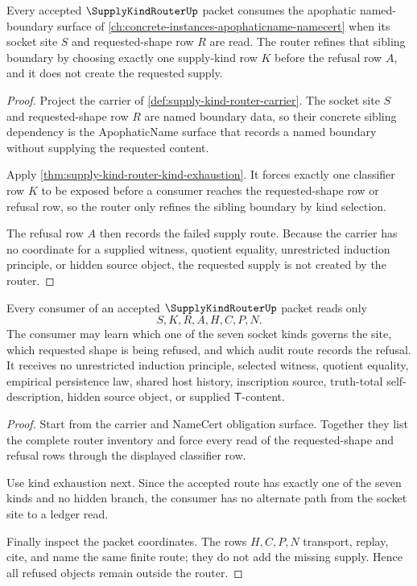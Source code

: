 \begin{theorem}
\label{thm:supply-kind-router-apophatic-socket-dependency}
Every accepted $\SupplyKindRouterUp$ packet consumes the apophatic named-boundary surface of \autoref{ch:concrete-instances-apophaticname-namecert} when its socket site $S$ and requested-shape row $R$ are read. The router refines that sibling boundary by choosing exactly one supply-kind row $K$ before the refusal row $A$, and it does not create the requested supply.
\end{theorem}
\begin{proof}
Project the carrier of \autoref{def:supply-kind-router-carrier}. The socket site $S$ and requested-shape row $R$ are named boundary data, so their concrete sibling dependency is the ApophaticName surface that records a named boundary without supplying the requested content.

Apply \autoref{thm:supply-kind-router-kind-exhaustion}. It forces exactly one classifier row $K$ to be exposed before a consumer reaches the requested-shape row or refusal row, so the router only refines the sibling boundary by kind selection.

The refusal row $A$ then records the failed supply route. Because the carrier has no coordinate for a supplied witness, quotient equality, unrestricted induction principle, or hidden source object, the requested supply is not created by the router.
\end{proof}

\begin{theorem}
\label{thm:supply-kind-router-nonescape}
Every consumer of an accepted $\SupplyKindRouterUp$ packet reads only
$$
S,K,R,A,H,C,P,N.
$$
The consumer may learn which one of the seven socket kinds governs the site, which requested shape is being refused, and which audit route records the refusal. It receives no unrestricted induction principle, selected witness, quotient equality, empirical persistence law, shared host history, inscription source, truth-total self-description, hidden source object, or supplied $\mathsf{T}$-content.
\end{theorem}
\begin{proof}
Start from the carrier and NameCert obligation surface. Together they list the complete router inventory and force every read of the requested-shape and refusal rows through the displayed classifier row.

Use kind exhaustion next. Since the accepted route has exactly one of the seven kinds and no hidden branch, the consumer has no alternate path from the socket site to a ledger read.

Finally inspect the packet coordinates. The rows $H,C,P,N$ transport, replay, cite, and name the same finite route; they do not add the missing supply. Hence all refused objects remain outside the router.
\end{proof}

